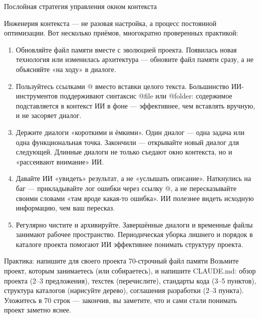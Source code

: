 \begin{center}\small\color{gray}Послойная стратегия управления окном контекста\end{center}


Инженерия контекста — не разовая настройка, а процесс постоянной оптимизации. Вот несколько приёмов, многократно проверенных практикой:

\begin{enumerate}
  \item Обновляйте файл памяти вместе с эволюцией проекта. Появилась новая технология или изменилась архитектура — обновите файл памяти сразу, а не объясняйте «на ходу» в диалоге.
  \item Пользуйтесь ссылками @ вместо вставки целого текста. Большинство ИИ-инструментов поддерживают синтаксис @file или @folder: содержимое подставляется в контекст ИИ в фоне — эффективнее, чем вставлять вручную, и не засоряет диалог.
  \item Держите диалоги «короткими и ёмкими». Один диалог — одна задача или одна функциональная точка. Закончили — открывайте новый диалог для следующей. Длинные диалоги не только съедают окно контекста, но и «рассеивают внимание» ИИ.
  \item Давайте ИИ «увидеть» результат, а не «услышать описание». Наткнулись на баг — прикладывайте лог ошибки через ссылку @, а не пересказывайте своими словами «там вроде какая-то ошибка». ИИ полезнее видеть исходную информацию, чем ваш пересказ.
  \item Регулярно чистите и архивируйте. Завершённые диалоги и временные файлы занимают рабочее пространство. Периодическая уборка лишнего и порядок в каталоге проекта помогают ИИ эффективнее понимать структуру проекта.
\end{enumerate}

\begin{tcbpractice}{Практика: напишите для своего проекта 70-строчный файл памяти}
Возьмите проект, которым занимаетесь (или собираетесь), и напишите CLAUDE.md: обзор проекта (2–3 предложения), техстек (перечислите), стандарты кода (3–5 пунктов), структура каталогов (нарисуйте дерево), соглашения разработки (2–3 пункта). Уложитесь в 70 строк — закончив, вы заметите, что и сами стали понимать проект заметно яснее.

\end{tcbpractice}

